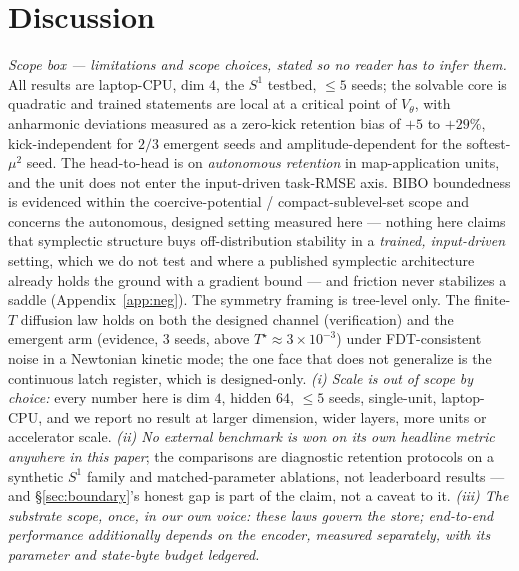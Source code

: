 \documentclass{article}
\begin{document}
\section{Discussion}\label{sec:discussion}

{
\emph{Scope box --- limitations and scope choices, stated so no reader has to infer them.} All results are laptop-CPU, dim $4$, the $S^1$ testbed, $\le5$ seeds; the solvable core is quadratic and trained statements are local at a critical point of $V_\theta$, with anharmonic deviations measured as a zero-kick retention bias of $+5$ to $+29\%$, kick-independent for $2/3$ emergent seeds and amplitude-dependent for the softest-$\mu^2$ seed. The head-to-head is on \emph{autonomous retention} in map-application units, and the unit does not enter the input-driven task-RMSE axis. BIBO boundedness is evidenced within the coercive-potential / compact-sublevel-set scope and concerns the autonomous, designed setting measured here --- nothing here claims that symplectic structure buys off-distribution stability in a \emph{trained, input-driven} setting, which we do not test and where a published symplectic architecture already holds the ground with a gradient bound --- and friction never stabilizes a saddle (Appendix~\ref{app:neg}). The symmetry framing is tree-level only. The finite-$T$ diffusion law holds on both the designed channel (verification) and the emergent arm (evidence, $3$ seeds, above $T^\star\approx3\!\times\!10^{-3}$) under FDT-consistent noise in a Newtonian kinetic mode; the one face that does not generalize is the continuous latch register, which is designed-only. \emph{(i) Scale is out of scope by choice:} every number here is dim $4$, hidden $64$, $\le5$ seeds, single-unit, laptop-CPU, and we report no result at larger dimension, wider layers, more units or accelerator scale. \emph{(ii) No external benchmark is won on its own headline metric anywhere in this paper}; the comparisons are diagnostic retention protocols on a synthetic $S^1$ family and matched-parameter ablations, not leaderboard results --- and \S\ref{sec:boundary}'s honest gap is part of the claim, not a caveat to it. \emph{(iii) The substrate scope, once, in our own voice: these laws govern the store; end-to-end performance additionally depends on the encoder, measured separately, with its parameter and state-byte budget ledgered.}
\par}
\end{document}
